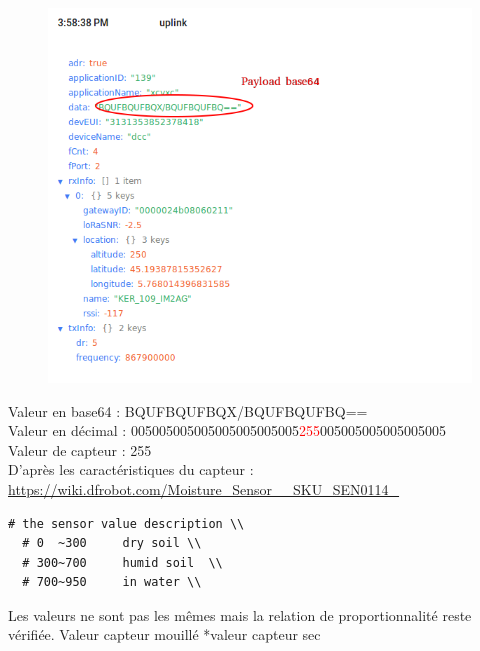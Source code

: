 \documentclass{article}
\begin{document}
\begin{figure}[H]
\begin{center}
\advance\leftskip-3cm
\advance\rightskip-3cm
\includegraphics[keepaspectratio=true,scale=0.4]{data_water.png}
\label{visina8}
\end{center}\end{figure}
Valeur en base64 : BQUFBQUFBQX/BQUFBQUFBQ== \\
Valeur en décimal : 005005005005005005005005\textcolor{red}{255}005005005005005005 \\
Valeur de capteur : 255 \\

D'après les caractéristiques du capteur : \url{https://wiki.dfrobot.com/Moisture_Sensor__SKU_SEN0114_}  

\begin{verbatim}
# the sensor value description \\
  # 0  ~300     dry soil \\
  # 300~700     humid soil  \\
  # 700~950     in water \\
\end{verbatim}

Les valeurs ne sont pas les mêmes mais la relation de proportionnalité reste vérifiée. Valeur capteur mouillé *valeur capteur sec
\end{document}
